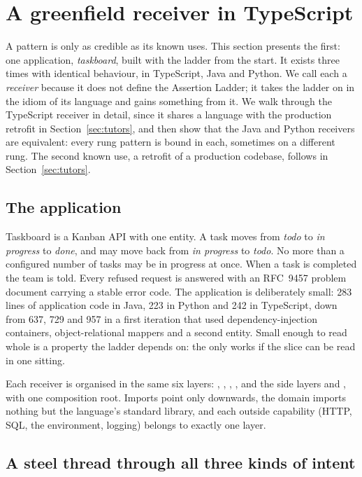 \section{A greenfield receiver in TypeScript}\label{sec:receivers}

A pattern is only as credible as its known uses. This section presents the first: one
application, \emph{taskboard}, built with the ladder from the start. It exists three times with
identical behaviour, in TypeScript, Java and Python. We call each a \emph{receiver} because it
does not define the Assertion Ladder; it takes the ladder on in the idiom of its language and
gains something from it. We walk through the TypeScript receiver in detail, since it shares a
language with the production retrofit in Section~\ref{sec:tutors}, and then show that the Java
and Python receivers are equivalent: every rung pattern is bound in each, sometimes on a
different rung. The second known use, a retrofit of a production codebase, follows in
Section~\ref{sec:tutors}.

\subsection{The application}

Taskboard is a Kanban API with one entity. A task moves from \emph{todo} to \emph{in progress}
to \emph{done}, and may move back from \emph{in progress} to \emph{todo}. No more than a
configured number of tasks may be in progress at once. When a task is completed the team is
told. Every refused request is answered with an RFC~9457 problem document carrying a stable
error code. The application is deliberately small: 283 lines of application code in Java, 223
in Python and 242 in TypeScript, down from 637, 729 and 957 in a first iteration that used
dependency-injection containers, object-relational mappers and a second entity. Small enough to read whole is a property the ladder depends on:
the  only works if the slice can be read in one sitting.

Each receiver is organised in the same six layers: , ,
, , and the side layers  and , with one
composition root. Imports point only downwards, the domain imports nothing but the language's
standard library, and each outside capability (HTTP, SQL, the environment, logging) belongs to
exactly one layer.

\subsection{A steel thread through all three kinds of intent}

